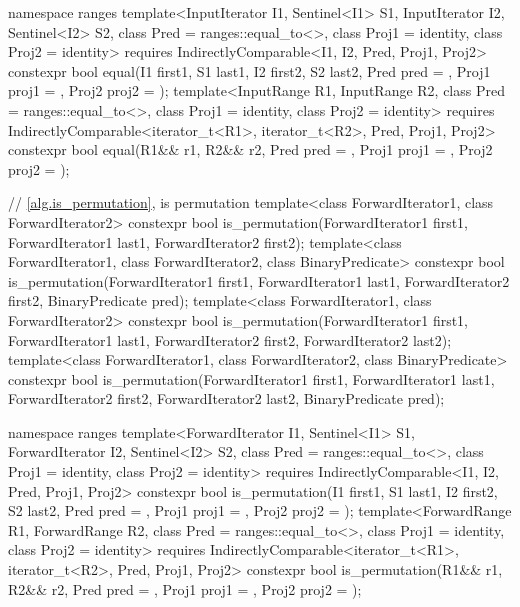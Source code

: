 \begin{codeblock}
{  namespace ranges {
    template<InputIterator I1, Sentinel<I1> S1, InputIterator I2, Sentinel<I2> S2,
        class Pred = ranges::equal_to<>, class Proj1 = identity, class Proj2 = identity>
      requires IndirectlyComparable<I1, I2, Pred, Proj1, Proj2>
      constexpr bool equal(I1 first1, S1 last1, I2 first2, S2 last2,
                           Pred pred = {},
                           Proj1 proj1 = {}, Proj2 proj2 = {});
    template<InputRange R1, InputRange R2, class Pred = ranges::equal_to<>,
        class Proj1 = identity, class Proj2 = identity>
      requires IndirectlyComparable<iterator_t<R1>, iterator_t<R2>, Pred, Proj1, Proj2>
      constexpr bool equal(R1&& r1, R2&& r2, Pred pred = {},
                           Proj1 proj1 = {}, Proj2 proj2 = {});
  }

  // \ref{alg.is_permutation}, is permutation
  template<class ForwardIterator1, class ForwardIterator2>
    constexpr bool is_permutation(ForwardIterator1 first1, ForwardIterator1 last1,
                                  ForwardIterator2 first2);
  template<class ForwardIterator1, class ForwardIterator2, class BinaryPredicate>
    constexpr bool is_permutation(ForwardIterator1 first1, ForwardIterator1 last1,
                                  ForwardIterator2 first2, BinaryPredicate pred);
  template<class ForwardIterator1, class ForwardIterator2>
    constexpr bool is_permutation(ForwardIterator1 first1, ForwardIterator1 last1,
                                  ForwardIterator2 first2, ForwardIterator2 last2);
  template<class ForwardIterator1, class ForwardIterator2, class BinaryPredicate>
    constexpr bool is_permutation(ForwardIterator1 first1, ForwardIterator1 last1,
                                  ForwardIterator2 first2, ForwardIterator2 last2,
                                  BinaryPredicate pred);

  namespace ranges {
    template<ForwardIterator I1, Sentinel<I1> S1, ForwardIterator I2,
        Sentinel<I2> S2, class Pred = ranges::equal_to<>, class Proj1 = identity,
        class Proj2 = identity>
      requires IndirectlyComparable<I1, I2, Pred, Proj1, Proj2>
      constexpr bool is_permutation(I1 first1, S1 last1, I2 first2, S2 last2,
                                    Pred pred = {},
                                    Proj1 proj1 = {}, Proj2 proj2 = {});
    template<ForwardRange R1, ForwardRange R2, class Pred = ranges::equal_to<>,
        class Proj1 = identity, class Proj2 = identity>
      requires IndirectlyComparable<iterator_t<R1>, iterator_t<R2>, Pred, Proj1, Proj2>
      constexpr bool is_permutation(R1&& r1, R2&& r2, Pred pred = {},
                                    Proj1 proj1 = {}, Proj2 proj2 = {});
  }

}
\end{codeblock}
